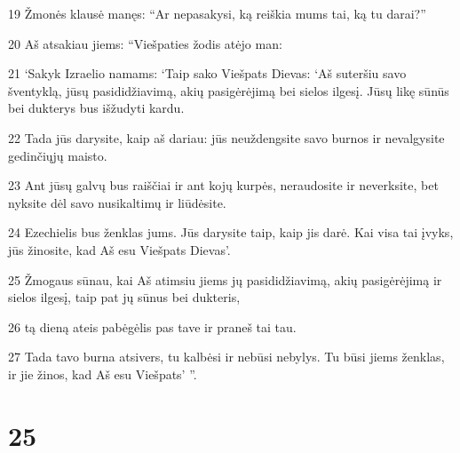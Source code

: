 \par 19 Žmonės klausė manęs: “Ar nepasakysi, ką reiškia mums tai, ką tu darai?” 
\par 20 Aš atsakiau jiems: “Viešpaties žodis atėjo man: 
\par 21 ‘Sakyk Izraelio namams: ‘Taip sako Viešpats Dievas: ‘Aš suteršiu savo šventyklą, jūsų pasididžiavimą, akių pasigėrėjimą bei sielos ilgesį. Jūsų likę sūnūs bei dukterys bus išžudyti kardu. 
\par 22 Tada jūs darysite, kaip aš dariau: jūs neuždengsite savo burnos ir nevalgysite gedinčiųjų maisto. 
\par 23 Ant jūsų galvų bus raiščiai ir ant kojų kurpės, neraudosite ir neverksite, bet nyksite dėl savo nusikaltimų ir liūdėsite. 
\par 24 Ezechielis bus ženklas jums. Jūs darysite taip, kaip jis darė. Kai visa tai įvyks, jūs žinosite, kad Aš esu Viešpats Dievas’. 
\par 25 Žmogaus sūnau, kai Aš atimsiu jiems jų pasididžiavimą, akių pasigėrėjimą ir sielos ilgesį, taip pat jų sūnus bei dukteris, 
\par 26 tą dieną ateis pabėgėlis pas tave ir praneš tai tau. 
\par 27 Tada tavo burna atsivers, tu kalbėsi ir nebūsi nebylys. Tu būsi jiems ženklas, ir jie žinos, kad Aš esu Viešpats’ ”.



\chapter{25}


